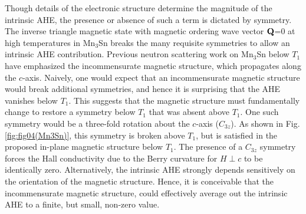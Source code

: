 \documentclass[prb,twocolumn,showpacs,preprintnumbers,amsmath,amssymb]{revtex4}
\begin{document}

Though details of the electronic structure determine the magnitude of the intrinsic AHE, the presence or absence of such a term is dictated by symmetry.\cite{MTSuzuki_arxiv2016} 
The inverse triangle magnetic state with magnetic ordering wave vector $\bf Q$=0 at high temperatures in Mn$_3$Sn breaks the many requisite symmetries to allow an intrinsic AHE contribution. 
Previous neutron scattering work on Mn$_3$Sn below $T_1$ have emphasized the incommensurate magnetic structure, which propagates along the $c$-axis.\cite{PJBrown, JWCableJAP1994} Naively, one would expect that an incommensurate magnetic structure would break additional symmetries, and hence it is surprising that the AHE vanishes below $T_1$. 
This suggests that the magnetic structure must fundamentally change to restore a symmetry below $T_1$ that was absent above $T_1$.
One such symmetry would be a three-fold rotation about the $c$-axis ($C_{3z}$). As shown in Fig. \ref{fig:fig04(Mn3Sn)}, this symmetry is broken above $T_1$, but is satisfied in the proposed in-plane magnetic structure below $T_1$. The presence of a $C_{3z}$ symmetry forces the Hall conductivity due to the Berry curvature for $H\perp c$ to be identically zero.\cite{MTSuzuki_arxiv2016}
Alternatively, the intrinsic AHE strongly depends sensitively on the orientation of the magnetic structure. Hence, it is conceivable that the incommensurate magnetic structure, could effectively average out the intrinsic AHE to a finite, but small, non-zero value.
\end{document}
